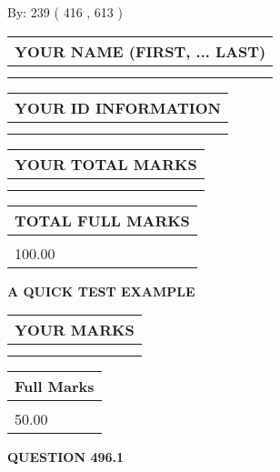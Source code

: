 \documentclass[12pt]{article}
\begin{document}
   
\hspace{1.0in} By: 
 239 ( 416 ,  613 )
   
   
   
   
\newpage 
\setcounter{page}{ 
   496001 } 
   
   
   
   
\noindent\begin{tabular}{|l|}
\hline
YOUR NAME (FIRST, ... LAST)  \\
\hline
 \\ 
 \\ 
\hline
\end{tabular}
\hspace{0.05in} \begin{tabular}{|l|}
\hline
 YOUR   ID   INFORMATION  \\
\hline
 \\ 
 \\ 
\hline
\end{tabular}
   
   
\vspace{0.2in}\noindent\begin{tabular}{|l|}
\hline
YOUR TOTAL MARKS  \\
\hline
 \\ 
 \\ 
\hline
\end{tabular}
\hspace{0.05in} \begin{tabular}{|l|}
\hline
TOTAL FULL MARKS  \\
\hline
 \\ 
100.00 \\
\hline
\end{tabular}
   
   
 \vspace{0.2in}
{\LARGE {\textbf{ A QUICK TEST EXAMPLE}}}
   
   
  
\vspace{0.2in}
  
\noindent\begin{tabular}{|l|}
\hline
 YOUR MARKS  \\
\hline
 \\ 
 \\ 
\hline
\end{tabular}
\hspace{0.05in} \begin{tabular}{|l|}
\hline
 Full Marks  \\
\hline
 \\ 
50.00 \\
\hline
\end{tabular}
{\textbf{\Large{QUESTION
496.1 
}}}
  
\end{document}
